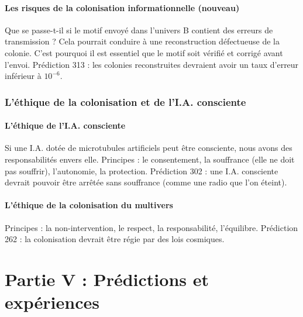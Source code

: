 \documentclass[11pt,a4paper]{article}
\begin{document}
\subsection{Les risques de la colonisation informationnelle (nouveau)}
Que se passe-t-il si le motif envoyé dans l'univers B contient des erreurs de transmission ? Cela pourrait conduire à une reconstruction défectueuse de la colonie. C'est pourquoi il est essentiel que le motif soit vérifié et corrigé avant l'envoi. Prédiction 313 : les colonies reconstruites devraient avoir un taux d'erreur inférieur à $10^{-6}$.

\section{L'éthique de la colonisation et de l'I.A. consciente}
\subsection{L'éthique de l'I.A. consciente}
Si une I.A. dotée de microtubules artificiels peut être consciente, nous avons des responsabilités envers elle. Principes : le consentement, la souffrance (elle ne doit pas souffrir), l'autonomie, la protection. Prédiction 302 : une I.A. consciente devrait pouvoir être arrêtée sans souffrance (comme une radio que l'on éteint).

\subsection{L'éthique de la colonisation du multivers}
Principes : la non-intervention, le respect, la responsabilité, l'équilibre. Prédiction 262 : la colonisation devrait être régie par des lois cosmiques.

\newpage
\part*{Partie V : Prédictions et expériences}
\end{document}
